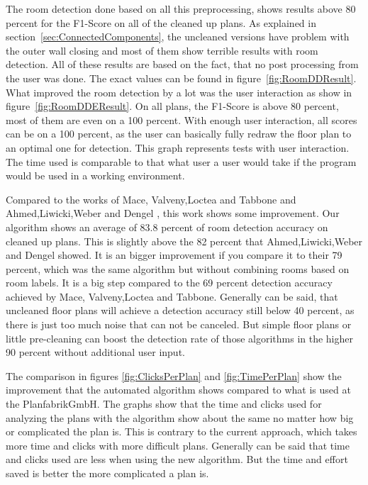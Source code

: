 The room detection done based on all this preprocessing, shows results above 80 percent for the F1-Score on all of the cleaned up plans. As explained in section~\ref{sec:ConnectedComponents}, the uncleaned versions have problem with the outer wall closing and most of them show terrible results with room detection. All of these results are based on the fact, that no post processing from the user was done. The exact values can be found in figure~\ref{fig:RoomDDResult}. What improved the room detection by a lot was the user interaction as show in figure~\ref{fig:RoomDDEResult}. On all plans, the F1-Score is above 80 percent, most of them are even on a 100 percent. With enough user interaction, all scores can be on a 100 percent, as the user can basically fully redraw the floor plan to an optimal one for detection. This graph represents tests with user interaction. The time used is comparable to that what user a user would take if the program would be used in a working environment.

Compared to the works of Mace, Valveny,Loctea and Tabbone \citep{mace_valveny_loctea_tabbone_2010} and Ahmed,Liwicki,Weber and Dengel \citep{ahmed_liwicki_weber_dengel_2012}, this work shows some improvement. Our algorithm shows an average of 83.8 percent of room detection accuracy on cleaned up plans. This is slightly above the 82 percent that Ahmed,Liwicki,Weber and Dengel showed. It is an bigger improvement if you compare it to their 79 percent, which was the same algorithm but without combining rooms based on room labels. It is a big step compared to the 69 percent detection accuracy achieved by Mace, Valveny,Loctea and Tabbone. Generally can be said, that uncleaned floor plans will achieve a detection accuracy still below 40 percent, as there is just too much noise that can not be canceled. But simple floor plans or little pre-cleaning can boost the detection rate of those algorithms in the higher 90 percent without additional user input. 

The comparison in figures \ref{fig:ClicksPerPlan} and \ref{fig:TimePerPlan} show the improvement that the automated algorithm shows compared to what is used at the PlanfabrikGmbH. The graphs show that the time and clicks used for analyzing the plans with the algorithm show about the same no matter how big or complicated the plan is. This is contrary to the current approach, which takes more time and clicks with more difficult plans. Generally can be said that time and clicks used are less when using the new algorithm. But the time and effort saved is better the more complicated a plan is. 

